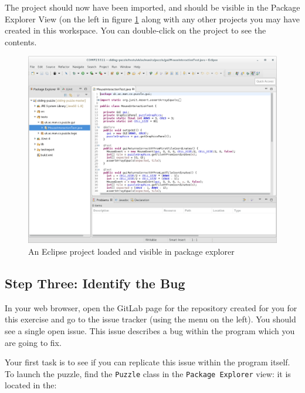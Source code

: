 \documentclass[
]{book}
\begin{document}
The project should now have been imported, and should be visible in the Package Explorer View (on the left in figure \ref{fig:eclipseProjectLoadedAndVisibleInPackageExplorer-fig} along with any other projects you may have created in this workspace. You can double-click on the project to see the contents.

\begin{figure}

{\centering \includegraphics[width=1\linewidth]{images/eclipseProjectLoadedAndVisibleInPackageExplorer} 

}

\caption{An Eclipse project loaded and visible in package explorer}\label{fig:eclipseProjectLoadedAndVisibleInPackageExplorer-fig}
\end{figure}

\hypertarget{bugid}{%
\subsection{Step Three: Identify the Bug}\label{bugid}}

In your web browser, open the GitLab page for the repository created for you for this exercise and go to the issue tracker (using the menu on the left). You should see a single open issue. This issue describes a bug within the program which you are going to fix.

Your first task is to see if you can replicate this issue within the program itself. To launch the puzzle, find the \texttt{Puzzle} class in the \texttt{Package Explorer} view: it is located in the:
\end{document}
